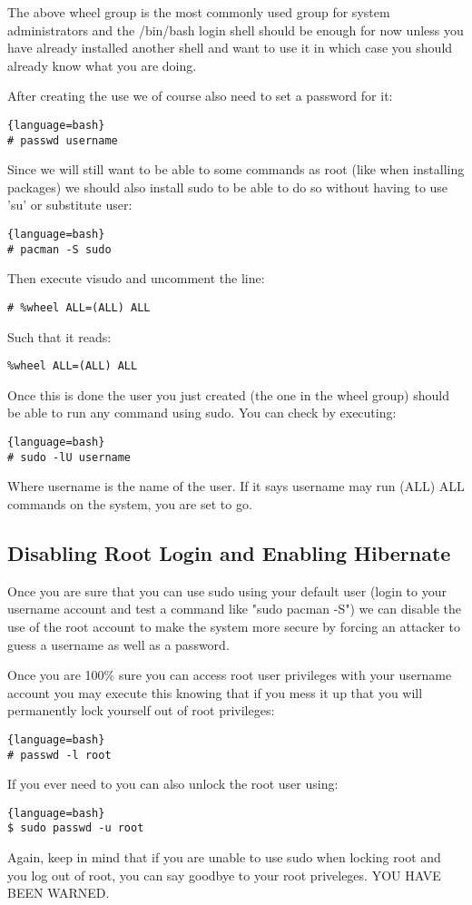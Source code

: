 The above wheel group is the most commonly used group for system administrators and the /bin/bash login shell should be enough for now unless you have already installed another shell and want to use it in which case you should already know what you are doing.

After creating the use we of course also need to set a password for it:
\begin{lstlisting}{language=bash}
# passwd username
\end{lstlisting}
Since we will still want to be able to some commands as root (like when installing packages) we should also install sudo to be able to do so without having to use 'su' or substitute user:
\begin{lstlisting}{language=bash}
# pacman -S sudo
\end{lstlisting}
Then execute visudo and uncomment the line:
\begin{verbatim}
# %wheel ALL=(ALL) ALL
\end{verbatim}
Such that it reads:
\begin{verbatim}
%wheel ALL=(ALL) ALL
\end{verbatim}
Once this is done the user you just created (the one in the wheel group) should be able to run any command using sudo. You can check by executing:
\begin{lstlisting}{language=bash}
# sudo -lU username
\end{lstlisting}
Where username is the name of the user. If it says username may run (ALL) ALL commands on the system, you are set to go.

\subsection{Disabling Root Login and Enabling Hibernate}
Once you are sure that you can use sudo using your default user (login to your username account and test a command like "sudo pacman -S") we can disable the use of the root account to make the system more secure by forcing an attacker to guess a username as well as a password.

Once you are 100\% sure you can access root user privileges with your username account you may execute this knowing that if you mess it up that you will permanently lock yourself out of root privileges:
\begin{lstlisting}{language=bash}
# passwd -l root
\end{lstlisting}
If you ever need to you can also unlock the root user using:
\begin{lstlisting}{language=bash}
$ sudo passwd -u root
\end{lstlisting}
Again, keep in mind that if you are unable to use sudo when locking root and you log out of root, you can say goodbye to your root priveleges. YOU HAVE BEEN WARNED.


